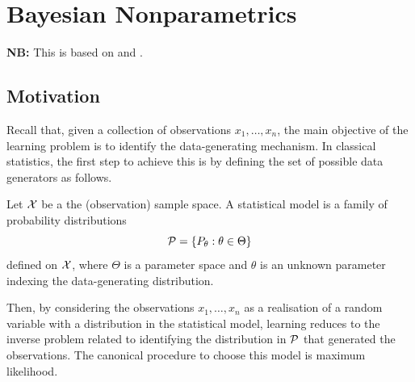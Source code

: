 \chapter{Bayesian Nonparametrics}

\textbf{NB:} This is based on \cite[Ch.~1-2]{Orbanz2014BayesianNP} and \cite[Ch.~2]{rasmussen2006gpml}.

\section{Motivation}

Recall that, given a collection of observations $x_1,\ldots,x_n$, the main objective of the learning problem is to identify the data-generating mechanism. In classical statistics, the first step to achieve this is by defining the set of possible data generators as follows.  
\begin{definition}
Let ${\mathcal X}$ be a the (observation) sample space.  
A statistical model is a family of probability distributions
\[
{\mathcal P} = \{ P_\theta : \theta \in \Theta \}
\]
defined on ${\mathcal X}$, where $\Theta$ is a parameter space and $\theta$ is an unknown parameter indexing the data-generating distribution.
\end{definition}

Then, by considering the observations $x_1,\ldots,x_n$ as a realisation of a random variable with a distribution in the statistical model, learning reduces to the inverse problem related to identifying the distribution in ${\mathcal P}$ that generated the observations. The canonical procedure to choose this model is maximum likelihood. 


